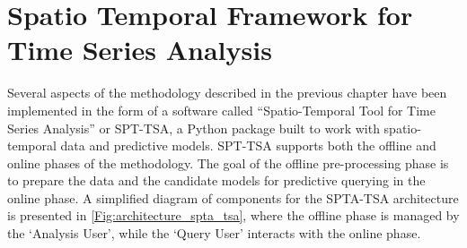 \chapter{Spatio Temporal Framework for Time Series Analysis}       
\label{Sec:SPTA-TSA}


Several aspects of the methodology described in the previous chapter have been implemented in the form of a software called ``Spatio-Temporal Tool for Time Series Analysis'' or SPT-TSA, a Python package built to work with spatio-temporal data and predictive models. SPT-TSA supports both the offline and online phases of the methodology. The goal of the offline pre-processing phase is to prepare the data and the candidate models for predictive querying in the online phase. A simplified diagram of components for the SPTA-TSA architecture is presented in \ref{Fig:architecture_spta_tsa}, where the offline phase is managed by the `Analysis User', while the `Query User' interacts with the online phase.

